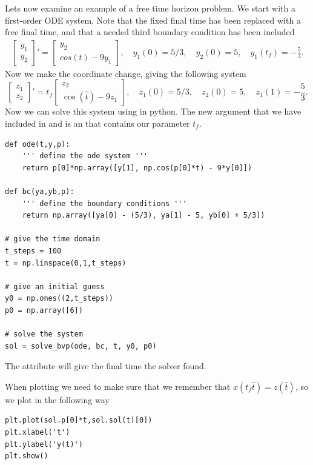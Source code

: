 Lets now examine an example of a free time horizon problem.
We start with a first-order ODE system. Note that the fixed final time has been replaced with a free final time, and that a needed third boundary condition has been included
\begin{align*}
    \begin{bmatrix}
        y_1\\y_2
    \end{bmatrix}'
    =
    \begin{bmatrix}
        y_2 \\
        cos(t) - 9y_1
    \end{bmatrix},
    \quad y_1(0) = 5/3,\quad y_2(0) = 5,\quad y_1(t_f) = -\frac{5}{3}.
\end{align*}
Now we make the coordinate change, giving the following system
\begin{equation}\label{ex:bvp2}
    \begin{bmatrix}
        z_1\\z_2
    \end{bmatrix}'
    =
    t_f\begin{bmatrix}
        z_2 \\
        \cos(\hat{t}) - 9z_1
    \end{bmatrix},
    \quad z_1(0) = 5/3,\quad z_2(0) = 5,\quad z_1(1) = -\frac{5}{3}.
\end{equation}
Now we can solve this system using  in python.
The new argument  that we have included in  and  is an  that contains our parameter $t_f$.

\begin{lstlisting}
def ode(t,y,p):
    ''' define the ode system '''
    return p[0]*np.array([y[1], np.cos(p[0]*t) - 9*y[0]])

def bc(ya,yb,p):
    ''' define the boundary conditions '''
    return np.array([ya[0] - (5/3), ya[1] - 5, yb[0] + 5/3])

# give the time domain
t_steps = 100
t = np.linspace(0,1,t_steps)

# give an initial guess
y0 = np.ones((2,t_steps))
p0 = np.array([6])

# solve the system
sol = solve_bvp(ode, bc, t, y0, p0)
\end{lstlisting}
The attribute  will give the final time the solver found.

When plotting we need to make sure that we remember that $x(t_f\hat{t}) = z(\hat{t})$, so we plot in the following way
\begin{lstlisting}
plt.plot(sol.p[0]*t,sol.sol(t)[0])
plt.xlabel('t')
plt.ylabel('y(t)')
plt.show()
\end{lstlisting}

